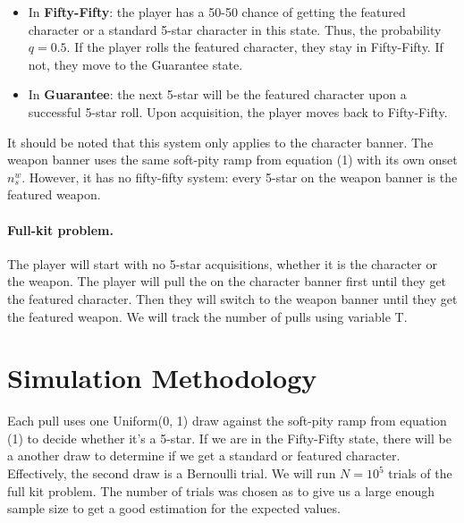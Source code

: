 \documentclass[11pt]{article}
\begin{document}
\begin{itemize}
 \item In \textbf{Fifty-Fifty}: the player has a 50-50 chance of getting the featured character or 
a standard 5-star character in this state. Thus, the probability $q = 0.5$.
If the player rolls the featured character, they stay in Fifty-Fifty. If not, they move to the Guarantee state.
\item In \textbf{Guarantee}: the next 5-star will be the featured character upon a successful
5-star roll. Upon acquisition, the player moves back to Fifty-Fifty.
\end{itemize}

It should be noted that this system only applies to the character banner.
The weapon banner uses the same soft-pity ramp from
equation (1) with its own onset $n_s^w$. However, it has no fifty-fifty
system: every 5-star on the weapon banner is the featured
weapon.

\paragraph{Full-kit problem.} The player will start with no 5-star
acquisitions, whether it is the character or the weapon. The player will
pull the on the character banner first until they get the featured character. Then
they will switch to the weapon banner until they get the featured weapon. We will track
the number of pulls using variable T.

\section{Simulation Methodology}

Each pull uses one Uniform(0, 1) draw against the soft-pity
ramp from equation (1) to decide whether it's a 5-star. If we are in the Fifty-Fifty state,
there will be a another draw to determine if we get a standard or featured character. Effectively,
the second draw is a Bernoulli trial. We will run $N = 10^5$ trials of the full kit
problem. The number of trials was chosen as to give us a large enough sample size
to get a good estimation for the expected values.
\end{document}
